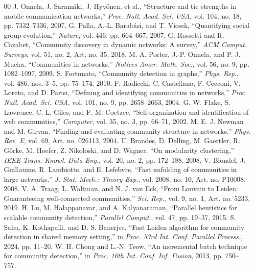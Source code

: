 \documentclass[conference]{IEEEtran}
\theoremstyle{definition}
\begin{document}
\begin{thebibliography}{00}
\fontsize{6.39}{6.40}\selectfont\setlength{\itemsep}{0pt}\setlength{\parsep}{0pt}\setlength{\parskip}{0pt}
    J. Onnela, J. Saram{\"a}ki, J. Hyv{\"o}nen, et al., ``Structure and tie strengths in mobile communication networks,'' \textit{Proc. Natl. Acad. Sci. USA}, vol. 104, no. 18, pp. 7332--7336, 2007.
    G. Palla, A.-L. Barab{\'a}si, and T. Vicsek, ``Quantifying social group evolution,'' \textit{Nature}, vol. 446, pp. 664--667, 2007.
    G. Rossetti and R. Cazabet, ``Community discovery in dynamic networks: A survey,'' \textit{ACM Comput. Surveys}, vol. 51, no. 2, Art. no. 35, 2018.
    M. A. Porter, J.-P. Onnela, and P. J. Mucha, ``Communities in networks,'' \textit{Notices Amer. Math. Soc.}, vol. 56, no. 9, pp. 1082--1097, 2009.
    S. Fortunato, ``Community detection in graphs,'' \textit{Phys. Rep.}, vol. 486, nos. 3--5, pp. 75--174, 2010.
    F. Radicchi, C. Castellano, F. Cecconi, V. Loreto, and D. Parisi, ``Defining and identifying communities in networks,'' \textit{Proc. Natl. Acad. Sci. USA}, vol. 101, no. 9, pp. 2658--2663, 2004.
    G. W. Flake, S. Lawrence, C. L. Giles, and F. M. Coetzee, ``Self-organization and identification of web communities,'' \textit{Computer}, vol. 35, no. 3, pp. 66--71, 2002.
    M. E. J. Newman and M. Girvan, ``Finding and evaluating community structure in networks,'' \textit{Phys. Rev. E}, vol. 69, Art. no. 026113, 2004.
    U. Brandes, D. Delling, M. Gaertler, R. G{\"o}rke, M. Hoefer, Z. Nikoloski, and D. Wagner, ``On modularity clustering,'' \textit{IEEE Trans. Knowl. Data Eng.}, vol. 20, no. 2, pp. 172--188, 2008.
    V. Blondel, J. Guillaume, R. Lambiotte, and E. Lefebvre, ``Fast unfolding of communities in large networks,'' \textit{J. Stat. Mech.: Theory Exp.}, vol. 2008, no. 10, Art. no. P10008, 2008.
    V. A. Traag, L. Waltman, and N. J. van Eck, ``From Louvain to Leiden: Guaranteeing well-connected communities,'' \textit{Sci. Rep.}, vol. 9, no. 1, Art. no. 5233, 2019.
    H. Lu, M. Halappanavar, and A. Kalyanaraman, ``Parallel heuristics for scalable community detection,'' \textit{Parallel Comput.}, vol. 47, pp. 19--37, 2015.
    S. Sahu, K. Kothapalli, and D. S. Banerjee, ``Fast Leiden algorithm for community detection in shared memory setting,'' in \textit{Proc. 53rd Int. Conf. Parallel Process.}, 2024, pp. 11--20.
    W. H. Chong and L.-N. Teow, ``An incremental batch technique for community detection,'' in \textit{Proc. 16th Int. Conf. Inf. Fusion}, 2013, pp. 750--757.

\end{thebibliography}
\end{document}
